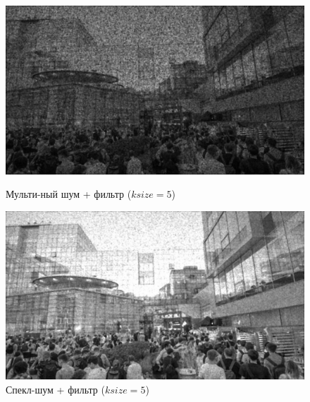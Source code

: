 \documentclass[a4paper]{article}
\begin{document}
\begin{figure}[H]
    \begin{minipage}{0.49\textwidth}
        \centering \includegraphics[width=\textwidth]{images/3_nonlinear_filters/multiplicative - 2d-median (ksize=5).jpg}
        \caption{Мульти-ный шум + фильтр ($ksize = 5$)}
    \end{minipage}\hfill
    \begin{minipage}{0.49\textwidth}
        \centering \includegraphics[width=\textwidth]{images/3_nonlinear_filters/speckle - 2d-median (ksize=5).jpg}
        \caption{Спекл-шум + фильтр ($ksize = 5$)}
    \end{minipage}
\end{figure}
\end{document}

